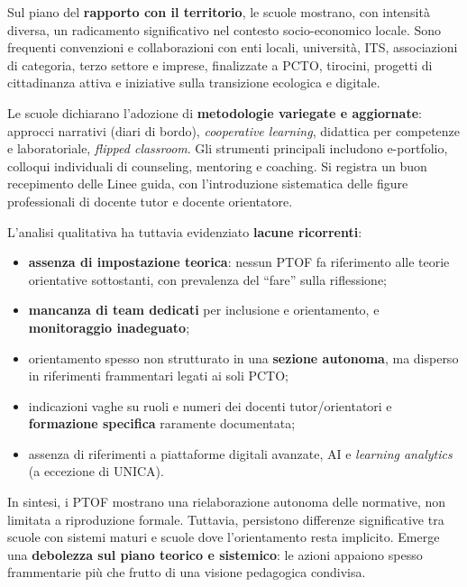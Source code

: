 \documentclass[12pt,a4paper]{article}
\begin{document}
Sul piano del \textbf{rapporto con il territorio}, le scuole mostrano, con intensit\`a diversa, un radicamento significativo nel contesto socio-economico locale. Sono frequenti convenzioni e collaborazioni con enti locali, universit\`a, ITS, associazioni di categoria, terzo settore e imprese, finalizzate a PCTO, tirocini, progetti di cittadinanza attiva e iniziative sulla transizione ecologica e digitale.

Le scuole dichiarano l'adozione di \textbf{metodologie variegate e aggiornate}: approcci narrativi (diari di bordo), \textit{cooperative learning}, didattica per competenze e laboratoriale, \textit{flipped classroom}. Gli strumenti principali includono e-portfolio, colloqui individuali di counseling, mentoring e coaching. Si registra un buon recepimento delle Linee guida, con l'introduzione sistematica delle figure professionali di docente tutor e docente orientatore.

L'analisi qualitativa ha tuttavia evidenziato \textbf{lacune ricorrenti}:
\begin{itemize}[nosep]
  \item \textbf{assenza di impostazione teorica}: nessun PTOF fa riferimento alle teorie orientative sottostanti, con prevalenza del ``fare'' sulla riflessione;
  \item \textbf{mancanza di team dedicati} per inclusione e orientamento, e \textbf{monitoraggio inadeguato};
  \item orientamento spesso non strutturato in una \textbf{sezione autonoma}, ma disperso in riferimenti frammentari legati ai soli PCTO;
  \item indicazioni vaghe su ruoli e numeri dei docenti tutor/orientatori e \textbf{formazione specifica} raramente documentata;
  \item assenza di riferimenti a piattaforme digitali avanzate, AI e \textit{learning analytics} (a eccezione di UNICA).
\end{itemize}

In sintesi, i PTOF mostrano una rielaborazione autonoma delle normative, non limitata a riproduzione formale. Tuttavia, persistono differenze significative tra scuole con sistemi maturi e scuole dove l'orientamento resta implicito. Emerge una \textbf{debolezza sul piano teorico e sistemico}: le azioni appaiono spesso frammentarie pi\`u che frutto di una visione pedagogica condivisa.
\end{document}
